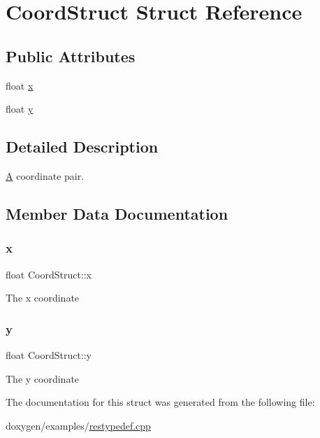 \hypertarget{struct_coord_struct}{}\section{Coord\+Struct Struct Reference}
\label{struct_coord_struct}
\subsection*{Public Attributes}
\begin{DoxyCompactItemize}
\item 
float \mbox{\hyperlink{struct_coord_struct_a183d7226fc5a8470ce9b9f04f9cb69bb}{x}}
\item 
float \mbox{\hyperlink{struct_coord_struct_a1a5966a881bc3e76e9becf00639585ac}{y}}
\end{DoxyCompactItemize}


\subsection{Detailed Description}
\mbox{\hyperlink{class_a}{A}} coordinate pair. 

\subsection{Member Data Documentation}
\mbox{\label{struct_coord_struct_a183d7226fc5a8470ce9b9f04f9cb69bb}} 
\subsubsection{\texorpdfstring{x}{x}}
{\footnotesize\ttfamily float Coord\+Struct\+::x}

The x coordinate \mbox{\label{struct_coord_struct_a1a5966a881bc3e76e9becf00639585ac}} 
\subsubsection{\texorpdfstring{y}{y}}
{\footnotesize\ttfamily float Coord\+Struct\+::y}

The y coordinate 

The documentation for this struct was generated from the following file\+:\begin{DoxyCompactItemize}
\item 
doxygen/examples/\mbox{\hyperlink{restypedef_8cpp}{restypedef.\+cpp}}\end{DoxyCompactItemize}
